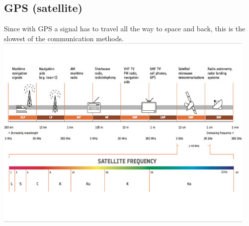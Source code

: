 \subsection{GPS (satellite)}
Since with GPS a signal has to travel all the way to space and back, this is the slowest of the communication methods. 
\includegraphics[width=0.95\textwidth]{images/satellite_frequency_bands.jpg}

